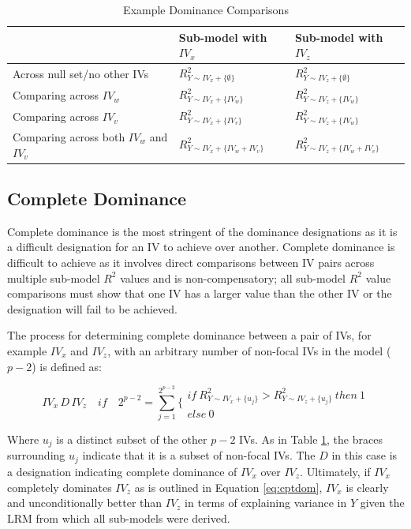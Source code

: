 \documentclass[ShortAfour,times,sageapa]{sagej}
\begin{document}
		\begin{table}[h!]
			\centering
			\caption{\centering Example Dominance Comparisons}
			\begin{tabular}{ l | l l }
				
				& Sub-model with $IV_x$ & Sub-model with $IV_z$ \\
				\hline
				Across null set/no other IVs & $R^2_{Y \sim IV_x + \{\emptyset\}}$ & $R^2_{Y \sim IV_z+ \{\emptyset\} }$ \\
				Comparing across $IV_w$ & $R^2_{Y \sim IV_x + \{IV_w\}}$ & $R^2_{Y \sim IV_z + \{IV_w\}}$ \\
				Comparing across $IV_v$ & $R^2_{Y \sim IV_x + \{IV_v\}}$ & $R^2_{Y \sim IV_z + \{IV_w\}}$ \\
				Comparing across both $IV_w$ and $IV_v$ & $R^2_{Y \sim IV_x + \{IV_w + IV_v\}}$ & $R^2_{Y \sim IV_z + \{IV_w + IV_v\}}$ \\
				\hline
		\end{tabular}
		\label{tab:exdom}
	\end{table}
	
	\subsection{Complete Dominance}
	
	Complete dominance is the most stringent of the dominance designations as it is a difficult designation for an IV to achieve over another.
	Complete dominance is difficult to achieve as it involves direct comparisons between IV pairs across multiple sub-model $R^2$ values and is non-compensatory; all sub-model $R^2$ value comparisons must show that one IV has a larger value than the other IV or the designation will fail to be achieved.
	
	The process for determining complete dominance between a pair of IVs, for example $IV_x$ and $IV_z$, with an arbitrary number of non-focal IVs in the model ($p - 2$) is defined as:
	
	\begin{equation}
		IV_x \, D \, IV_z \quad if \quad 2^{p-2} = \sum^{2^{p-2}}_{j=1} \Biggr\{ \begin{matrix} if \ R^2_{Y \sim IV_x + \{u_j\}} > R^2_{Y \sim IV_z + \{u_j\}} \ then \ 1 \\ else \ 0 \end{matrix}
		\label{eq:cptdom}
	\end{equation}
	
	Where $u_j$ is a distinct subset of the other $p - 2$ IVs.
	As in Table \ref{tab:exdom}, the braces surrounding $u_j$ indicate that it is a subset of non-focal IVs.
	The $D$ in this case is a designation indicating complete dominance of $IV_x$ over $IV_z$.
	Ultimately, if $IV_x$ completely dominates $IV_z$ as is outlined in Equation \ref{eq:cptdom}, $IV_x$ is clearly and unconditionally better than $IV_z$ in terms of explaining variance in $Y$ given the LRM from which all sub-models were derived.	
	
\end{document}

